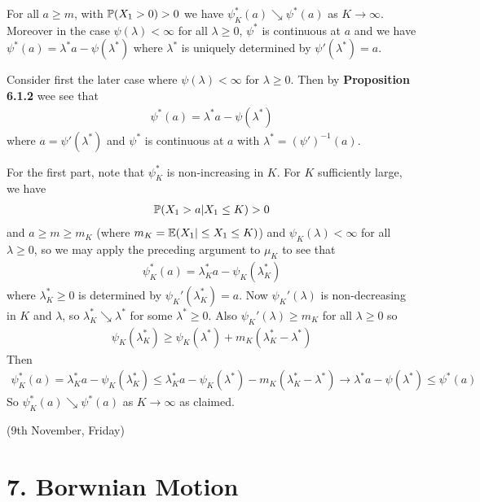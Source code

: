 \documentclass[10pt,a4paper]{report}
\newenvironment{proof}
{\begin{changemargin}{1cm}{0.5cm} 
	}%
	{\end{changemargin}
}
\begin{document}
 For all $a\geq m$, with $\mathbb{P}(X_1 > 0) > 0$ we have $\psi^*_K(a) \searrow \psi^*(a)$ as $K\rightarrow \infty$. Moreover in the case $\psi(\lambda) < \infty$ for all $\lambda \geq 0$, $\psi^*$ is continuous at $a$ and we have $\psi^*(a) =\lambda^* a - \psi(\lambda^*)$ where $\lambda^*$ is uniquely determined by $\psi'(\lambda^*) = a$.
\begin{proof}
\pf Consider first the later case where $\psi(\lambda) < \infty$ for $\lambda \geq 0$. Then by \textbf{Proposition 6.1.2} wee see that
\begin{align*}
\psi^*(a) = \lambda^* a -\psi(\lambda^*)
\end{align*}
where $a= \psi' (\lambda^*)$ and $\psi^*$ is continuous at $a$ with $\lambda^* = (\psi')^{-1}(a)$.
\s

\quad For the first part, note that $\psi_K^*$ is non-increasing in $K$. For $K$ sufficiently large, we have
\begin{align*}
\mathbb{P}(X_1>a | X_1 \leq K) >0
\end{align*}
and $a\geq m \geq m_K$ (where $m_K = \mathbb{E}(X_1 |\leq X_1 \leq K)$) and $\psi_K(\lambda) < \infty$ for all $\lambda \geq 0$, so we may apply the preceding argument to $\mu_K$ to see that
\begin{align*}
\psi^*_K(a) = \lambda_K^* a - \psi_K(\lambda_K^*)
\end{align*}
where $\lambda_K^* \geq 0$ is determined by $\psi_K'(\lambda_K^*) = a$. Now $\psi_K'(\lambda)$ is non-decreasing in $K$ and $\lambda$, so $\lambda_K^* \searrow \lambda^*$ for some $\lambda^* \geq 0$. Also $\psi_K'(\lambda) \geq m_K$ for all $\lambda \geq 0$ so
\begin{align*}
\psi_K(\lambda_K^*) \geq \psi_K(\lambda^*) + m_K(\lambda_K^* - \lambda^*)
\end{align*}
Then
\begin{align*}
\psi^*_K(a) = \lambda_K^* a - \psi_K(\lambda^*_K) \leq \lambda^*_K a - \psi_K(\lambda^*) - m_K(\lambda^*_K - \lambda^*) \rightarrow \lambda^* a - \psi(\lambda^*) \leq \psi^*(a)
\end{align*}
So $\psi_K^*(a) \searrow \psi^*(a)$ as $K\rightarrow \infty$ as claimed.

\eop
\end{proof}
\s

\newday

(9th November, Friday)
\s

\section*{7. Borwnian Motion}
\end{document}
